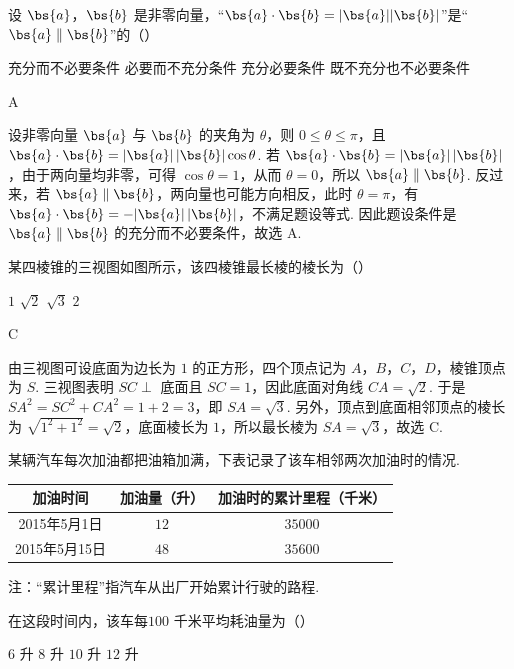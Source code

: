 \begin{problem}
设 \(\bs{a}\)，\(\bs{b}\) 是非零向量，“\(\bs{a} \cdot \bs{b} = |\bs{a}| |\bs{b}|\)”是“\(\bs{a} \parallel \bs{b}\)”的（\quad）

\choices
    {充分而不必要条件}
    {必要而不充分条件}
    {充分必要条件}
    {既不充分也不必要条件}
\end{problem}

\begin{answer}
A
\end{answer}

\begin{solution}
设非零向量 \(\bs{a}\) 与 \(\bs{b}\) 的夹角为 \(\theta\)，则 \(0\leq\theta\leq\pi\)，且 \(\bs{a}\cdot\bs{b}=|\bs{a}|\,|\bs{b}|\cos\theta\). 若 \(\bs{a}\cdot\bs{b}=|\bs{a}|\,|\bs{b}|\)，由于两向量均非零，可得 \(\cos\theta=1\)，从而 \(\theta=0\)，所以 \(\bs{a}\parallel\bs{b}\). 反过来，若 \(\bs{a}\parallel\bs{b}\)，两向量也可能方向相反，此时 \(\theta=\pi\)，有 \(\bs{a}\cdot\bs{b}=-|\bs{a}|\,|\bs{b}|\)，不满足题设等式. 因此题设条件是 \(\bs{a}\parallel\bs{b}\) 的充分而不必要条件，故选 A.
\end{solution}

\begin{problem}
某四棱锥的三视图如图所示，该四棱锥最长棱的棱长为（\quad）


\choices
    {\(1\)}
    {\(\sqrt{2}\)}
    {\(\sqrt{3}\)}
    {\(2\)}
\end{problem}

\begin{answer}
C
\end{answer}

\begin{solution}
由三视图可设底面为边长为 \(1\) 的正方形，四个顶点记为 \(A\)，\(B\)，\(C\)，\(D\)，棱锥顶点为 \(S\). 三视图表明 \(SC\perp\) 底面且 \(SC=1\)，因此底面对角线 \(CA=\sqrt{2}\). 于是 \(SA^2=SC^2+CA^2=1+2=3\)，即 \(SA=\sqrt{3}\). 另外，顶点到底面相邻顶点的棱长为 \(\sqrt{1^2+1^2}=\sqrt{2}\)，底面棱长为 \(1\)，所以最长棱为 \(SA=\sqrt{3}\)，故选 C.
\end{solution}

\begin{problem}
某辆汽车每次加油都把油箱加满，下表记录了该车相邻两次加油时的情况.

\begin{center}
\begin{tabular}{|c|c|c|}
\hline
加油时间 & 加油量（升） & 加油时的累计里程（千米） \\
\hline
2015年5月1日 & \(12\) & \(35000\) \\
\hline
2015年5月15日 & \(48\) & \(35600\) \\
\hline
\end{tabular}
\end{center}

注：“累计里程”指汽车从出厂开始累计行驶的路程.

在这段时间内，该车每\(100\text{ 千米}\)平均耗油量为（\quad）

\choices
    {\(6\text{ 升}\)}
    {\(8\text{ 升}\)}
    {\(10\text{ 升}\)}
    {\(12\text{ 升}\)}
\end{problem}

